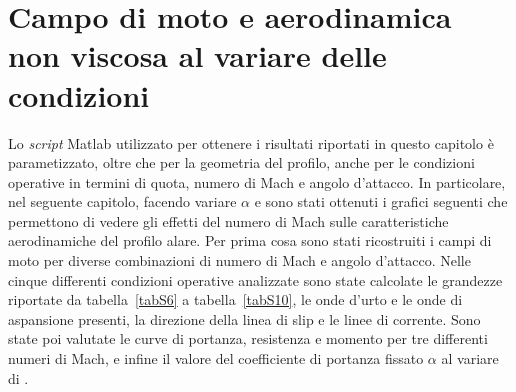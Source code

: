 
\chapter{Campo di moto e aerodinamica non viscosa al variare delle condizioni}
Lo {\itshape script} Matlab utilizzato per ottenere i risultati riportati in questo capitolo è parametizzato, oltre che per la geometria del profilo, anche per le condizioni operative in termini di quota, numero di Mach e angolo d'attacco. In particolare, nel seguente capitolo, facendo variare $\alpha$ e \Minf sono stati ottenuti i grafici seguenti che permettono di vedere gli effetti del numero di Mach sulle caratteristiche aerodinamiche del profilo alare.
Per prima cosa sono stati ricostruiti i campi di moto per diverse combinazioni di numero di Mach e angolo d'attacco. Nelle cinque differenti condizioni operative analizzate sono state calcolate le grandezze riportate da tabella~\vref{tabS6} a tabella~\vref{tabS10}, le onde d'urto e le onde di aspansione presenti, la direzione della linea di slip e le linee di corrente. Sono state poi valutate le curve di portanza, resistenza e momento per tre differenti numeri di Mach, e infine il valore del coefficiente di portanza fissato $\alpha$ al variare di \Minf.



